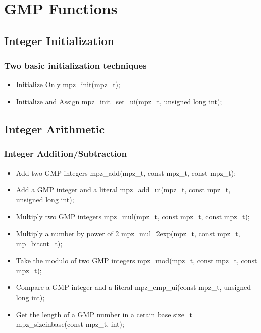 \section{GMP Functions}


\subsection{Integer Initialization}

\begin{frame}
\frametitle{Two basic initialization techniques}
  \begin{itemize}
    \item Initialize Only\break
    mpz\_init(mpz\_t);
    \item Initialize and Assign\break
    mpz\_init\_set\_ui(mpz\_t, unsigned long int);
  \end{itemize}
\end{frame}


\subsection{Integer Arithmetic}

\begin{frame}
\frametitle{Integer Addition/Subtraction}
  \begin{itemize}
    \item Add two GMP integers\break
    mpz\_add(mpz\_t, const mpz\_t, const mpz\_t);
    \item Add a GMP integer and a literal\break
    mpz\_add\_ui(mpz\_t, const mpz\_t, unsigned long int);
    \item Multiply two GMP integers\break
    mpz\_mul(mpz\_t, const mpz\_t, const mpz\_t);
    \item Multiply a number by power of 2\break
    mpz\_mul\_2exp(mpz\_t, const mpz\_t, mp\_bitcnt\_t);
    \item Take the modulo of two GMP integers\break
    mpz\_mod(mpz\_t, const mpz\_t, const mpz\_t);
    \item Compare a GMP integer and a literal\break
    mpz\_cmp\_ui(const mpz\_t, unsigned long int);
    \item Get the length of a GMP number in a cerain base\break
    size\_t mpz\_sizeinbase(const mpz\_t, int);
  \end{itemize}
\end{frame}


